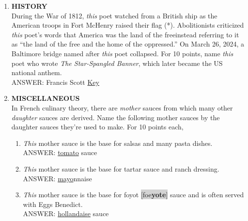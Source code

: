 \documentclass{report}
\newcommand*{\backtrack}{\setcounter{enumi}{\numexpr\theenumi-1\relax}}
\begin{document}
\begin{enumerate}
    \item \textbf{HISTORY} \\ During the War of 1812, \textit{this} poet watched from a British ship as the American troops in Fort McHenry raised their flag (*). Abolitionists criticized \textit{this} poet's words that America was the land of the free\textemdash instead referring to it as ``the land of the free and the home of the oppressed.'' On March 26, 2024, a Baltimore bridge named after \textit{this} poet collapsed. For 10 points, name \textit{this} poet who wrote \textit{The Star-Spangled Banner}, which later became the US national anthem. \\ ANSWER: Francis Scott \underline{Key} \backtrack
    \item \textbf{MISCELLANEOUS} \\ In French culinary theory, there are \textit{mother} sauces from which many other \textit{daughter} sauces are derived. Name the following mother sauces by the daughter sauces they're used to make. For 10 points each,
    \begin{enumerate}[label=\Alph*]
        \item \textit{This} mother sauce is the base for salsas and many pasta dishes. \\ ANSWER: \underline{tomato} sauce
        \item \textit{This} mother sauce is the base for tartar sauce and ranch dressing. \\ ANSWER: \underline{mayo}nnaise
        \item \textit{This} mother sauce is the base for foyot \colorbox{lightGray}{[foe\textperiodcentered \textbf{yote}]} sauce and is often served with Eggs Benedict. \\ ANSWER: \underline{hollandaise} sauce
    \end{enumerate}


\end{enumerate}
\end{document}
